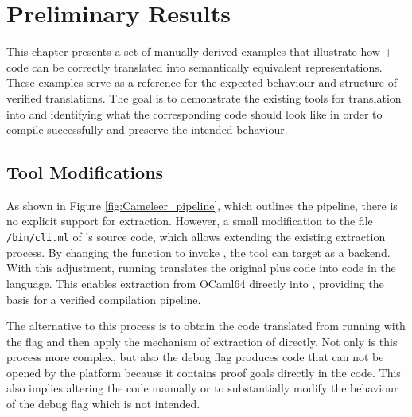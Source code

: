 
%

\chapter{Preliminary Results}
\label{cha:Preliminary_Results}

This chapter presents a set of manually derived examples that illustrate how \ocaml + \gospel code can be correctly translated into 
semantically equivalent \cml representations. These examples serve as a reference for the expected behaviour and structure of verified 
translations. The goal is to demonstrate the existing tools for translation into \cml and identifying what the corresponding \cml code 
should look like in order to compile successfully and preserve the intended behaviour.

\section{Tool Modifications}

As shown in Figure \ref{fig:Cameleer_pipeline}, which outlines the \cameleer pipeline, there is no explicit support for \cml extraction. 
However, a small modification to the file \texttt{/bin/cli.ml} of \cameleer 's source code, which allows extending the existing extraction 
process. By changing the  function to invoke 
, 
the tool can target \cml as a backend. With this adjustment, running  translates
the original \ocaml plus \gospel code into code in the \cml language. This enables extraction from \textsf{OCaml64} directly 
into \cml, providing the basis for a verified compilation pipeline.

The alternative to this process is to obtain the code translated \whyml from running \cameleer with the flag  
and then apply the mechanism of extraction of \whythree directly. Not only is this process more complex, but also the debug flag 
produces code that can not be opened by the \whythree platform because it contains proof goals directly in the code. This also implies
altering the code manually or to substantially modify the behaviour of the debug flag which is not intended.

